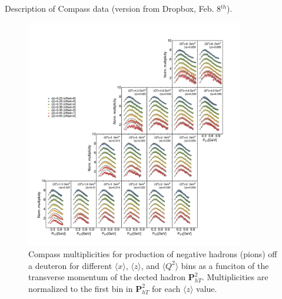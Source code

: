 \documentclass[aps,preprintnumbers,showpacs,nofootinbib,superscriptaddress,floatfix]{revtex4}
\begin{document}
Description of Compass data (version from Dropbox, Feb. 8$^{th}$).
\begin{figure}[h!]
\begin{center}
\includegraphics[width=0.85\textwidth]{plots/Compass/COMPASS_SCIplot_flINDEP_Piminus.pdf}
\end{center}
\caption{Compass multiplicities for production of negative hadrons (pions) off a deuteron for different $\langle x \rangle$, $\langle z \rangle$, and $\langle Q^2 \rangle$ bins as a funciton of the transverse momentum of the dected hadron ${\bm P}_{hT}^ 2$. Multiplicities are normalized to the first bin in ${\bm P}_{hT}^ 2$ for each $\langle z \rangle$ value.} 
\label{f:C_pim}
\end{figure}
\end{document}
